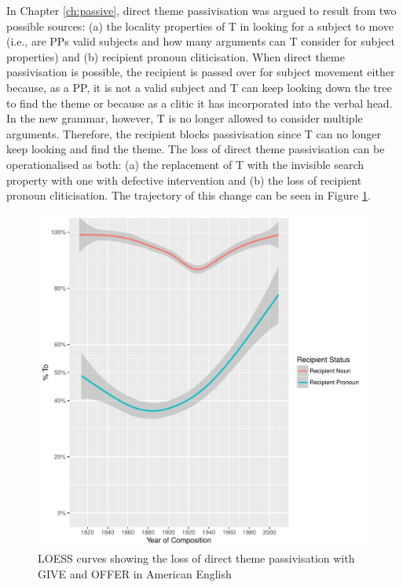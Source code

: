 	In Chapter \ref{ch:passive}, direct theme passivisation was argued to result from two possible sources: (a) the locality properties of T in looking for a subject to move (i.e., are PPs valid subjects and how many arguments can T consider for subject properties) and (b) recipient pronoun cliticisation. When direct theme passivisation is possible, the recipient is passed over for subject movement either because, as a PP, it is not a valid subject and T can keep looking down the tree to find the theme or because as a clitic it has incorporated into the verbal head. In the new grammar, however, T is no longer allowed to consider multiple arguments. Therefore, the recipient blocks passivisation since T can no longer keep looking and find the theme. The loss of direct theme passivisation can be operationalised as both: (a) the replacement of T with the invisible search property with one with defective intervention and (b) the loss of recipient pronoun cliticisation. The trajectory of this change can be seen in Figure \ref{fig:loss-of-dt-in-amen}.

	\begin{figure}[ht!]
		\includegraphics[width=\linewidth]{../images/directtheme-am}
		\caption{LOESS curves showing the loss of direct theme passivisation with GIVE and OFFER in American English}
		\label{fig:loss-of-dt-in-amen}
	\end{figure}

